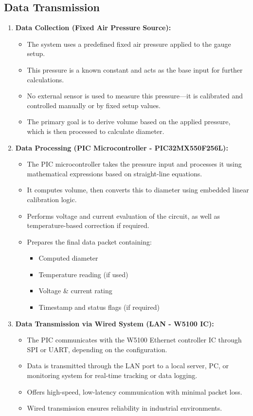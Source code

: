 \documentclass[12pt]{report}
\begin{document}
\subsection{Data Transmission}
\begin{enumerate}
    \item \textbf{Data Collection (Fixed Air Pressure Source):}
    \begin{itemize}
        \item The system uses a predefined fixed air pressure applied to the gauge setup.
        \item This pressure is a known constant and acts as the base input for further calculations.
        \item No external sensor is used to measure this pressure—it is calibrated and controlled manually or by fixed setup values.
        \item The primary goal is to derive volume based on the applied pressure, which is then processed to calculate diameter.
    \end{itemize}
    
    \item \textbf{Data Processing (PIC Microcontroller - PIC32MX550F256L):}
    \begin{itemize}
        \item The PIC microcontroller takes the pressure input and processes it using mathematical expressions based on straight-line equations.
        \item It computes volume, then converts this to diameter using embedded linear calibration logic.
        \item Performs voltage and current evaluation of the circuit, as well as temperature-based correction if required.
        \item Prepares the final data packet containing:
        \begin{itemize}
            \item Computed diameter
            \item Temperature reading (if used)
            \item Voltage \& current rating
            \item Timestamp and status flags (if required)
        \end{itemize}
    \end{itemize}
    
    \item \textbf{Data Transmission via Wired System (LAN - W5100 IC):}
    \begin{itemize}
        \item The PIC communicates with the W5100 Ethernet controller IC through SPI or UART, depending on the configuration.
        \item Data is transmitted through the LAN port to a local server, PC, or monitoring system for real-time tracking or data logging.
        \item Offers high-speed, low-latency communication with minimal packet loss.
        \item Wired transmission ensures reliability in industrial environments.
    \end{itemize}
    

\end{enumerate}
\end{document}
